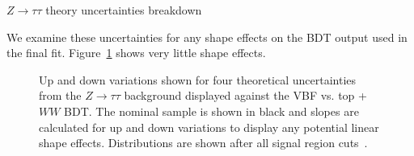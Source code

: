 \begin{table}[h!]
\centering
\scalebox{1.0}{

}
\caption{$Z\rightarrow\tau\tau$ theory uncertainties breakdown}
\label{tab:ztttheory}
\end{table}

We examine these uncertainties for any shape effects on the BDT output used in the final fit. Figure~\ref{fig:ztttheor} shows very little shape effects.

\begin{figure}[!h]
  \hfill
  \hfill
  \hfill
  \hfill
{\caption{Up and down variations shown for four theoretical uncertainties from the $Z\rightarrow\tau\tau$ background displayed against the VBF vs. top +$WW$ BDT. The nominal sample is shown in black and slopes are calculated for up and down variations to display any potential linear shape effects. Distributions are shown after all signal region cuts~\cite{ourSupportNote}.
\label{fig:ztttheor}}}
\end{figure}

